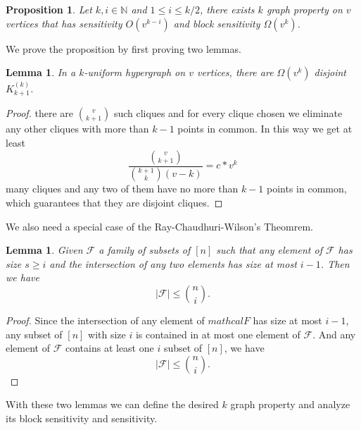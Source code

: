 \documentclass[psamsfonts]{amsart}
\newtheorem{prop}[thm]{Proposition}
\newtheorem{lem}[thm]{Lemma}
\theoremstyle{definition}
\theoremstyle{remark}
\numberwithin{equation}{section}
\begin{document}
	\begin{prop}
		Let $k,i \in \mathbb{N}$ and $1 \leq i \leq k/2$, there exists $k$ graph property on $v$ vertices that has sensitivity $O(v^{k-i})$ and block sensitivity $\Omega (v^{k})$.
	\end{prop}
	We prove the proposition by first proving two lemmas.
	\begin{lem}
		In a $k$-uniform hypergraph on $v$ vertices, there are $\Omega (v^k)$ disjoint $K_{k+1}^{(k)}$.
	\end{lem}
	\begin{proof}
		there are $v \choose{k+1}$ such cliques and for every clique chosen we eliminate any other cliques with more than $k-1$ points in common. In this way we get at least
		\begin{equation}
			\frac{{v \choose{k+1}}}{{k+1 \choose{k}}(v-k)} = c*v^{k}
		\end{equation}		 
	many cliques and any two of them have no more than $k-1$ points in common, which guarantees that they are disjoint cliques.
	\end{proof}
		We also need a special case of the Ray-Chaudhuri-Wilson's Theomrem.
	\begin{lem}
		Given $\mathcal{F}$ a family of subsets of $[n]$ such that any element of $\mathcal{F}$ has size $s \geq i$ and the intersection of any two elements has size at most $i-1$. Then we have
		\begin{equation}
			|\mathcal{F}| \leq {n \choose{i}}.
		\end{equation}
	\end{lem}
	\begin{proof}
		Since the intersection of any element of $mathcal{F}$ has size at most $i-1$, any subset of $[n]$ with size $i$ is contained in at most one element of $\mathcal{F}$. And any element of $\mathcal{F}$ contains at least one $i$ subset of $[n]$, we have 
		\begin{equation}
			|\mathcal{F}| \leq {n \choose{i}}.
		\end{equation}
	\end{proof}
	With these two lemmas we can define the desired $k$ graph property and analyze its block sensitivity and sensitivity.
\end{document}
